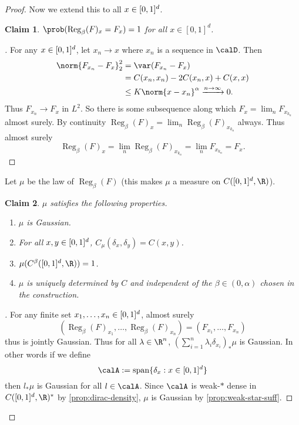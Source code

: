 \documentclass[fontsize=12pt, DIV=10]{scrreprt}
\theoremstyle{mydefn}
\newtheorem{claim}{Claim}
\theoremstyle{remark}
\newenvironment{subproof}[1][\proofname]{%
  \renewcommand{\qedsymbol}{$\blacksquare$}%
  \begin{proof}[#1]%
}{%
  \end{proof}%
}
\newcommand{\defeq}{:=}
\DeclareMathOperator{\reg}{Reg}
\DeclareMathOperator{\spn}{span}
\begin{document}
\begin{proof}
	Now we extend this to all $x \in [0,1]^d$.
	\begin{claim}
		$\prob(\reg_{\beta}(F)_x = F_x) = 1$ for all $x \in [0, 1]^d$.
	\end{claim}
	\begin{subproof}
		For any $x \in [0,1]^d$, let $x_n \to x$ where $x_n$ is a sequence in $\calD$. Then
		\begin{align}
			\norm{F_{x_n} - F_x}_2^2
			&= \var(F_{x_n} - F_x) \\
			&= C(x_n, x_n) - 2C(x_n, x) + C(x, x) \\
			&\leq K \norm{x - x_n}^{\alpha} \xrightarrow{n \to \infty} 0.
		\end{align}
		Thus $F_{x_n} \to F_x$ in $L^2$. So there is some subsequence along which $F_x = \lim_n F_{x_{k_n}}$ almost surely. By continuity $\reg_{\beta}(F)_x = \lim_n \reg_{\beta}(F)_{x_{k_n}}$ always. Thus almost surely
		\begin{equation}
			\reg_{\beta}(F)_x = \lim_n \reg_{\beta}(F)_{x_{k_n}}
			= \lim_n F_{x_{k_n}} = F_x.
		\end{equation}
	\end{subproof}

	Let $\mu$ be the law of $\reg_{\beta}(F)$ (this makes $\mu$ a measure on $C(\unitbox, \R)$). 
	\begin{claim}
		$\mu$ satisfies the following properties.
		\begin{enumerate}
			\item $\mu$ is Gaussian.
			\item For all $x, y \in [0,1]^d$, $C_{\mu}(\delta_x, \delta_y) = C(x, y)$.
			\item $\mu(C^{\beta}(\unitbox, \R)) = 1$.
			\item $\mu$ is uniquely determined by $C$ and independent of the $\beta \in (0, \alpha)$ chosen in the construction.
		\end{enumerate}
	\end{claim}
	\begin{subproof}
		For any finite set $x_1, \ldots, x_n \in [0,1]^d$, almost surely
		\begin{equation}
			(\reg_{\beta}(F)_{x_1}, \ldots, \reg_{\beta}(F)_{x_n})
			= (F_{x_1}, \ldots, F_{x_n})
		\end{equation}
		thus is jointly Gaussian. Thus for all $\lambda \in \R^n$, $(\sum_{i=1}^n \lambda_i \delta_{x_i})_* \mu$ is Gaussian. In other words if we define
		\begin{equation}
			\calA \defeq \spn\{ \delta_x : x \in [0, 1]^d\}
		\end{equation}
		then $l_* \mu$ is Gaussian for all $l \in \calA$. Since $\calA$ is weak-$*$ dense in $C([0, 1]^d, \R)^*$ by \vref{prop:dirac-density}, $\mu$ is Gaussian by \vref{prop:weak-star-suff}.


\end{subproof}
\end{proof}
\end{document}
